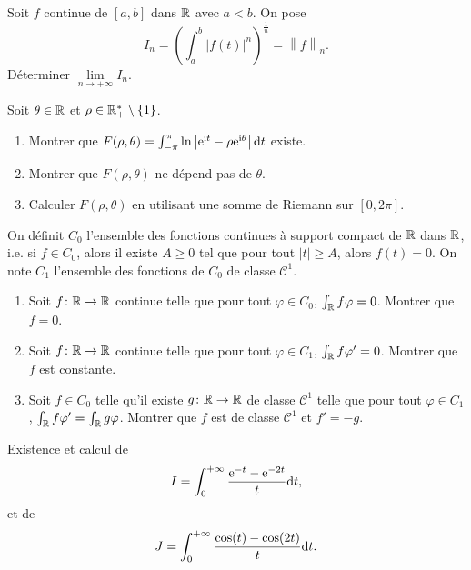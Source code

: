 \documentclass[12pt]{article}
\begin{document}
\begin{exercise}
    Soit $f$ continue de $[a,b]$ dans $\mathbb{R}$ avec $a<b$. On pose 
    \begin{equation}
        I_n=\left(\int_{a}^{b}\left\lvert f(t)\right\rvert^{n}\right)^{\frac{1}{n}}=\left\lVert f\right\rVert_{n}.
    \end{equation}
    Déterminer $\lim\limits_{n\to+\infty}I_n$.
\end{exercise}

\begin{exercise}
    Soit $\theta\in\mathbb{R}$ et $\rho\in\mathbb{R}_{+}^{*}\setminus\left\lbrace1\right\rbrace$.
    \begin{enumerate}
        \item Montrer que $F(\rho,\theta)=\int_{-\pi}^{\pi}\ln\left\lvert\mathrm{e}^{\mathrm{i} t}-\rho\mathrm{e}^{\mathrm{i}\theta}\right\rvert\mathrm{d} t$ existe.
        \item Montrer que $F(\rho,\theta)$ ne dépend pas de $\theta$.
        \item Calculer $F(\rho,\theta)$ en utilisant une somme de Riemann sur $[0,2\pi]$.
    \end{enumerate}
\end{exercise}

\begin{exercise}
    On définit $C_{0}$ l'ensemble des fonctions continues à support compact de $\mathbb{R}$ dans $\mathbb{R}$, i.e. si $f\in C_{0}$, alors il existe $A\geqslant0$ tel que pour tout $\left\lvert t\right\rvert\geqslant A$, alors $f(t)=0$. On note $C_{1}$ l'ensemble des fonctions de $C_{0}$ de classe $\mathcal{C}^{1}$.
    \begin{enumerate}
        \item Soit $f\colon\mathbb{R}\to\mathbb{R}$ continue telle que pour tout $\varphi\in C_{0}$, $\int_{\mathbb{R}}f\varphi=0$. Montrer que $f=0$.
        \item Soit $f\colon\mathbb{R}\to\mathbb{R}$ continue telle que pour tout $\varphi\in C_{1}$, $\int_{\mathbb{R}}f\varphi'=0$. Montrer que $f$ est constante.
        \item Soit $f\in C_{0}$ telle qu'il existe $g\colon\mathbb{R}\to\mathbb{R}$ de classe $\mathcal{C}^{1}$ telle que pour tout $\varphi\in C_{1}$, $\int_{\mathbb{R}}f\varphi'=\int_{\mathbb{R}}g\varphi$. Montrer que $f$ est de classe $\mathcal{C}^{1}$ et $f'=-g$.
    \end{enumerate}
\end{exercise}

\begin{exercise}
    Existence et calcul de 
    \begin{equation}
        I=\int_{0}^{+\infty}\frac{\mathrm{e}^{-t}-\mathrm{e}^{-2t}}{t}\mathrm{d} t,
    \end{equation}
    et de 
    \begin{equation}
        J=\int_{0}^{+\infty}\frac{\cos(t)-\cos(2t)}{t}\mathrm{d} t.
    \end{equation}
\end{exercise}
\end{document}
